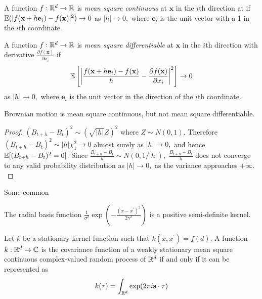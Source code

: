 \begin{definition}
    A function $f:\mathbb{R}^d\to\mathbb{R}$ is \emph{mean square continuous} at $\mathbf{x}$
    in the $i$th direction at if
    $\operatorname{\mathbb{E}}(|f(\mathbf{x} + h\mathbf{e}_i) - f(\mathbf{x})|^2)\to 0$ as $|h|\to 0,$
    where $\mathbf{e}_i$ is the unit vector with a 1 in the $i$th coordinate.
\end{definition}

\begin{definition}
    A function $f:\mathbb{R}^d\to\mathbb{R}$ is \emph{mean square differentiable} at
    $\mathbf{x}$ in the $i$th direction with derivative
    $\frac{\partial f(\mathbf{x})}{\partial x_i}$ if
    $$
        \operatorname{\mathbb{E}}\left[
            \left|
            \frac{f(\mathbf{x} + h\mathbf{e}_i) - f(\mathbf{x})}{h} 
            - \frac{\partial f(\mathbf{x})}{\partial x_i}
            \right|^2
            \right]\to 0
    $$ as $|h|\to 0,$ where $\mathbf{e}_i$ is the unit vector in the direction
    of the $i$th coordinate.
\end{definition}

\begin{theorem}
    Brownian motion is mean square continuous, but not mean square 
    differentiable.
\end{theorem}
\begin{proof}
    $(B_{t + h} - B_t)^2 \sim (\sqrt{|h|}Z)^2$ where $Z\sim N(0,1).$ Therefore 
    $(B_{t + h} - B_t)^2 \sim |h|\chi_1^2 \to 0$ almost surely as $|h|\to 0,$ 
    and hence $\operatorname{\mathbb{E}}[(B_{t + h} - B_t)^2= 0]$. Since 
    $\frac{B_{t + h} - B_t}{h} \sim N(0, 1/|h|),$ $\frac{B_{t + h} - B_t}{h}$ 
    does not converge to any valid probability distribution as $|h| \to 0,$ as 
    the variance approaches $+\infty.$
\end{proof}

Some common

\color{red}

\begin{theorem}\label{thm:rbf_pos_def}
    The radial basis function
    $\frac{1}{\sigma^2}\exp(-\frac{(x - x^\prime)^2}{2\gamma^2})$ is a positive
    semi-definite kernel.
\end{theorem}

\begin{theorem}
    Let $k$ be a stationary kernel function such that
    $k(x, x^\prime) = f(d)$. A function $k:\mathbb{R}^d\to\mathbb{C}$ is the covariance
    function of a weakly
    stationary mean square continuous complex-valued random process of $\mathbb{R}^d$
    if and only if it can be represented as
    $$k(\mathbf{\tau}) = \int_{\mathbb{R}^d} \exp(2\pi i \mathbf{s}\cdot\mathbf{\tau})$$
\end{theorem}


